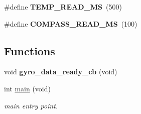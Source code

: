 \begin{DoxyCompactItemize}
\item 
\hypertarget{group__e_m_p_l_ga209a05c6769a81d074903aaffe2f44a6}{}\#define {\bfseries T\+E\+M\+P\+\_\+\+R\+E\+A\+D\+\_\+\+M\+S}~(500)\label{group__e_m_p_l_ga209a05c6769a81d074903aaffe2f44a6}

\item 
\hypertarget{group__e_m_p_l_ga0718d456616de258f21190908610fdf6}{}\#define {\bfseries C\+O\+M\+P\+A\+S\+S\+\_\+\+R\+E\+A\+D\+\_\+\+M\+S}~(100)\label{group__e_m_p_l_ga0718d456616de258f21190908610fdf6}

\end{DoxyCompactItemize}
\subsection*{Functions}
\begin{DoxyCompactItemize}
\item 
\hypertarget{group__e_m_p_l_ga97b092893abbc0853590db8530636b63}{}void {\bfseries gyro\+\_\+data\+\_\+ready\+\_\+cb} (void)\label{group__e_m_p_l_ga97b092893abbc0853590db8530636b63}

\item 
int \hyperlink{group__e_m_p_l_ga840291bc02cba5474a4cb46a9b9566fe}{main} (void)
\begin{DoxyCompactList}\small\item\em main entry point. \end{DoxyCompactList}\end{DoxyCompactItemize}
